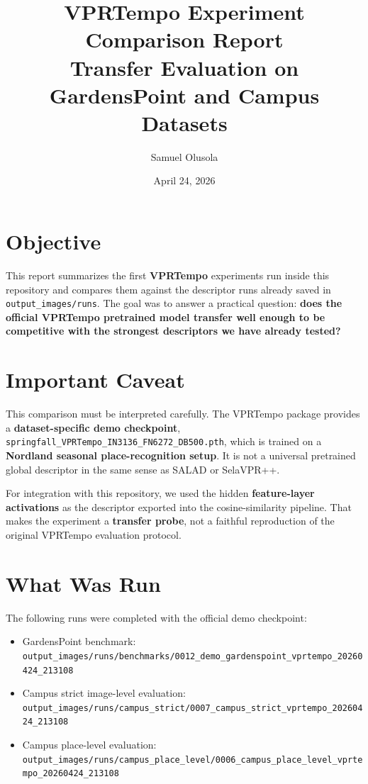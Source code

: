 \documentclass[11pt]{article}
\title{\textbf{VPRTempo Experiment Comparison Report}\\[4pt]
Transfer Evaluation on GardensPoint and Campus Datasets}
\author{Samuel Olusola}
\date{April 24, 2026}
\begin{document}
\maketitle

\section*{Objective}
This report summarizes the first \textbf{VPRTempo} experiments run inside this repository and compares them against the descriptor runs already saved in \texttt{output\_images/runs}. The goal was to answer a practical question: \textbf{does the official VPRTempo pretrained model transfer well enough to be competitive with the strongest descriptors we have already tested?}

\section*{Important Caveat}
This comparison must be interpreted carefully. The VPRTempo package provides a \textbf{dataset-specific demo checkpoint}, \texttt{springfall\_VPRTempo\_IN3136\_FN6272\_DB500.pth}, which is trained on a \textbf{Nordland seasonal place-recognition setup}. It is not a universal pretrained global descriptor in the same sense as SALAD or SelaVPR++.

For integration with this repository, we used the hidden \textbf{feature-layer activations} as the descriptor exported into the cosine-similarity pipeline. That makes the experiment a \textbf{transfer probe}, not a faithful reproduction of the original VPRTempo evaluation protocol.

\section*{What Was Run}
The following runs were completed with the official demo checkpoint:
\begin{itemize}[leftmargin=*]
  \item GardensPoint benchmark: \texttt{output\_images/runs/benchmarks/0012\_demo\_gardenspoint\_vprtempo\_20260424\_213108}
  \item Campus strict image-level evaluation: \texttt{output\_images/runs/campus\_strict/0007\_campus\_strict\_vprtempo\_20260424\_213108}
  \item Campus place-level evaluation: \texttt{output\_images/runs/campus\_place\_level/0006\_campus\_place\_level\_vprtempo\_20260424\_213108}
\end{itemize}
\end{document}
